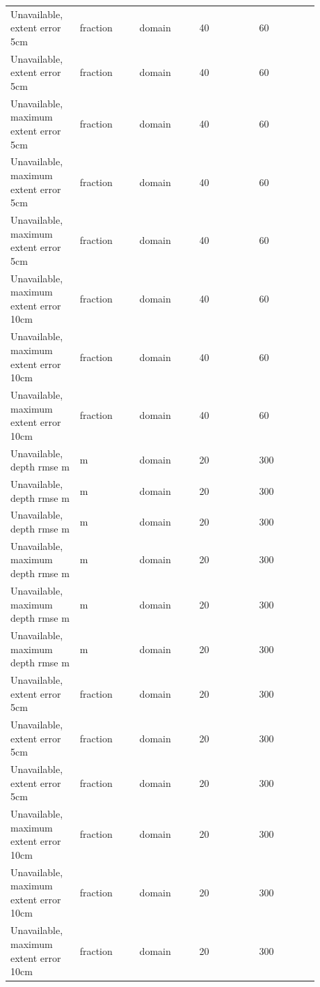 \begin{longtable}{p{0.1760\linewidth}p{0.1760\linewidth}p{0.1760\linewidth}p{0.1760\linewidth}p{0.1760\linewidth}}
Unavailable, extent error 5cm & fraction & domain & 40 & 60 \\
Unavailable, extent error 5cm & fraction & domain & 40 & 60 \\
Unavailable, maximum extent error 5cm & fraction & domain & 40 & 60 \\
Unavailable, maximum extent error 5cm & fraction & domain & 40 & 60 \\
Unavailable, maximum extent error 5cm & fraction & domain & 40 & 60 \\
Unavailable, maximum extent error 10cm & fraction & domain & 40 & 60 \\
Unavailable, maximum extent error 10cm & fraction & domain & 40 & 60 \\
Unavailable, maximum extent error 10cm & fraction & domain & 40 & 60 \\
Unavailable, depth rmse m & m & domain & 20 & 300 \\
Unavailable, depth rmse m & m & domain & 20 & 300 \\
Unavailable, depth rmse m & m & domain & 20 & 300 \\
Unavailable, maximum depth rmse m & m & domain & 20 & 300 \\
Unavailable, maximum depth rmse m & m & domain & 20 & 300 \\
Unavailable, maximum depth rmse m & m & domain & 20 & 300 \\
Unavailable, extent error 5cm & fraction & domain & 20 & 300 \\
Unavailable, extent error 5cm & fraction & domain & 20 & 300 \\
Unavailable, extent error 5cm & fraction & domain & 20 & 300 \\
Unavailable, maximum extent error 10cm & fraction & domain & 20 & 300 \\
Unavailable, maximum extent error 10cm & fraction & domain & 20 & 300 \\
Unavailable, maximum extent error 10cm & fraction & domain & 20 & 300 \\
\end{longtable}
